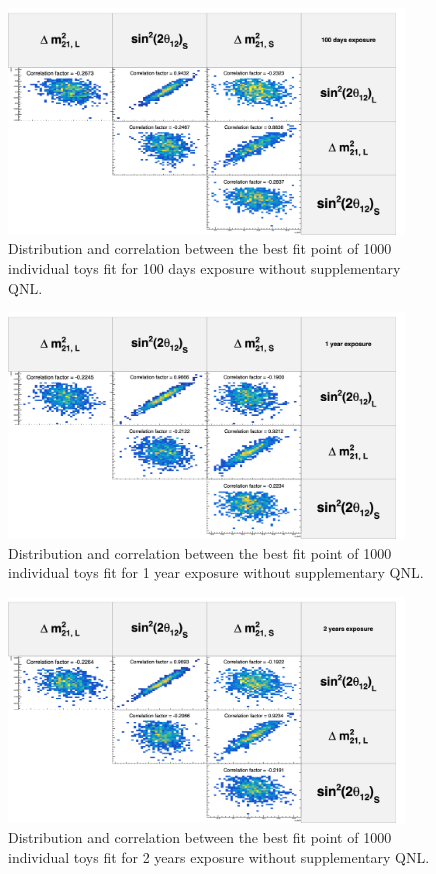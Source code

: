 \documentclass[../main.tex]{subfiles}
\begin{document}
\begin{figure}[ht]
  \centering
  \includegraphics[height=6cm]{images/joint_fit/stat_tests/chi2_ind_corr_100d.png}
  \caption{Distribution and correlation between the best fit point of 1000 individual toys fit for 100 days exposure without supplementary QNL.}
  \label{fig:joint_fit:chi2_ind:corr:100d}
\end{figure}
\begin{figure}[ht]
  \centering
  \includegraphics[height=6cm]{images/joint_fit/stat_tests/chi2_ind_corr_1y.png}
  \caption{Distribution and correlation between the best fit point of 1000 individual toys fit for 1 year exposure without supplementary QNL.}
  \label{fig:joint_fit:chi2_ind:corr:1y}
\end{figure}
\begin{figure}[ht]
  \centering
  \includegraphics[height=6cm]{images/joint_fit/stat_tests/chi2_ind_corr_2y.png}
  \caption{Distribution and correlation between the best fit point of 1000 individual toys fit for 2 years exposure without supplementary QNL.}
  \label{fig:joint_fit:chi2_ind:corr:2y}
\end{figure}
\end{document}

